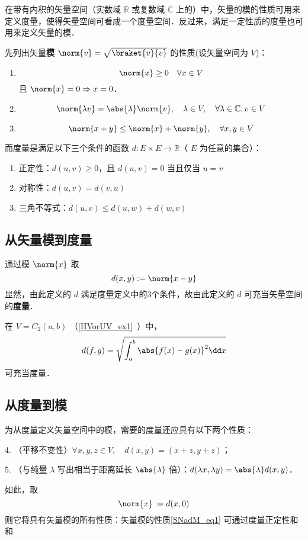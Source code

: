 

在带有内积的矢量空间（实数域 $\mathbb R$ 或复数域 $\mathbb C$ 上的）中，矢量的模的性质可用来定义度量，使得矢量空间可看成一个度量空间．反过来，满足一定性质的度量也可用来定义矢量的模．

先列出矢量\textbf{模} $\norm{v}=\sqrt{\braket{v}{v}}$ 的性质(设矢量空间为 $V$)：
\begin{enumerate}
\item 
\begin{equation}\label{SNadM_eq1}
\norm{x}\geq 0\quad \forall x\in V
\end{equation}
且 $\norm{x}=0\Rightarrow x=0$．
\item \begin{equation}\label{SNadM_eq2}
\norm{\lambda v}=\abs{\lambda}\norm{v},\quad \lambda\in V,\quad\forall\lambda\in\mathbb C,v\in V
\end{equation}
\item 
\begin{equation}
\norm{x+y}\leq\norm{x}+\norm{y},\quad \forall x,y\in V
\end{equation}
\end{enumerate}

而度量是满足以下三个条件的函数 $d:E\times E\rightarrow\mathbb R$（ $E$ 为任意的集合）：
\begin{enumerate}
\item 正定性：$d(u, v) \geq 0$，且 $d(u, v)=0$ 当且仅当 $u=v$
\item 对称性：$d(u, v) = d(v, u)$
\item 三角不等式：$d(u, v) \leqslant d(u, w) + d(w, v)$
\end{enumerate}
\subsection{从矢量模到度量}
通过模 $\norm{x}$ 取
\begin{equation}
d(x,y):=\norm{x-y}
\end{equation}
显然，由此定义的 $d$ 满足度量定义中的3个条件，故由此定义的 $d$ 可充当矢量空间的\textbf{度量}．
\begin{example}{}
在 $V=C_2(a,b)$ （\autoref{HVorUV_ex1}~）中，
\begin{equation}
d(f,g)=\sqrt{\int_a^b\abs{f(x)-g(x)}^2\dd x}
\end{equation}
可充当度量．
\end{example}
\subsection{从度量到模}
为从度量定义矢量空间中的模，需要的度量还应具有以下两个性质：

4. （平移不变性）$\forall x,y,z\in V,\quad d(x,y)=(x+z,y+z)$；

5. （与纯量 $\lambda$ 写出相当于距离延长 $\abs{\lambda}$ 倍）：$d(\lambda x,\lambda y)=\abs{\lambda}d(x,y)$．

如此，取 
\begin{equation}
\norm{x}:=d(x,0)
\end{equation}
则它将具有矢量模的所有性质：矢量模的性质\autoref{SNadM_eq1} 可通过度量正定性和和